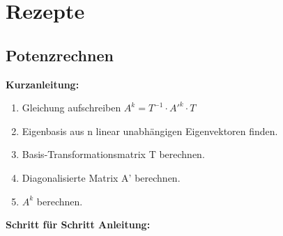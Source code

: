 \clearpage
\section{Rezepte}

\subsection{Potenzrechnen}
\textbf{Kurzanleitung:}
\begin{enumerate}
	\item Gleichung aufschreiben $A^k=T^{-1} \cdot {A'}^k \cdot T$
	\item Eigenbasis aus n linear unabhängigen Eigenvektoren finden.
	\item Basis-Transformationsmatrix T berechnen.
	\item Diagonalisierte Matrix A' berechnen.
	\item $A^k$ berechnen.
\end{enumerate}
\textbf{Schritt für Schritt Anleitung:}
